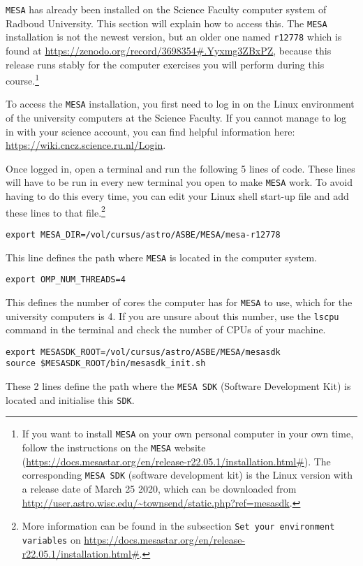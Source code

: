 \documentclass[11pt,a4paper]{article}
\begin{document}
\texttt{MESA} has already been installed on the Science Faculty computer system of Radboud University. This section will explain how to access this. The \texttt{MESA} installation is not the newest version, but an older one named \texttt{r12778} which is found at \url{https://zenodo.org/record/3698354#.Yyxmg3ZBxPZ}, because this release runs stably for the computer exercises you will perform during this course.\footnote{If you want to install \texttt{MESA} on your own personal computer in your own time, follow the instructions on the \texttt{MESA} website (\url{https://docs.mesastar.org/en/release-r22.05.1/installation.html\#}). The corresponding \texttt{MESA SDK} (software development kit) is the Linux version with a release date of March 25 2020, which can be downloaded from \url{http://user.astro.wisc.edu/~townsend/static.php?ref=mesasdk}. }

\bigskip\noindent
To access the \texttt{MESA} installation, you first need to log in on the Linux environment of the university computers at the Science Faculty. If you cannot manage to log in with your science account, you can find helpful information here: \url{https://wiki.cncz.science.ru.nl/Login}. 

\bigskip\noindent
Once logged in, open a terminal and run the following 5 lines of code. These lines will have to be run in every new terminal you open to make \texttt{MESA} work. To avoid having to do this every time, you can edit your Linux shell start-up file and add these lines to that file.\footnote{More information can be found in the subsection \texttt{Set your environment variables} on \url{https://docs.mesastar.org/en/release-r22.05.1/installation.html\#}.}

\begin{verbatim}
export MESA_DIR=/vol/cursus/astro/ASBE/MESA/mesa-r12778
\end{verbatim}
This line defines the path where \texttt{MESA} is located in the computer system.

\begin{verbatim}
export OMP_NUM_THREADS=4
\end{verbatim}
This defines the number of cores the computer has for \texttt{MESA} to use, which for the university computers is 4. If you are unsure about this number, use the \texttt{lscpu} command in the terminal and check the number of CPUs of your machine.

\begin{verbatim}
export MESASDK_ROOT=/vol/cursus/astro/ASBE/MESA/mesasdk
source $MESASDK_ROOT/bin/mesasdk_init.sh
\end{verbatim}
These 2 lines define the path where the \texttt{MESA SDK} (Software Development Kit) is located and initialise this \texttt{SDK}. 
\end{document}
